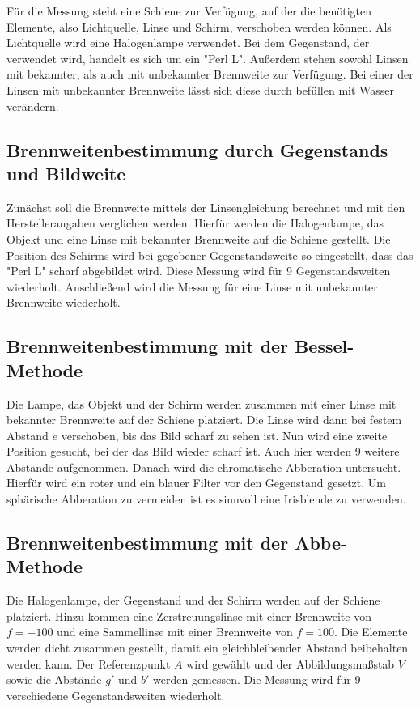 Für die Messung steht eine Schiene zur Verfügung, auf der die benötigten Elemente,
also Lichtquelle, Linse und Schirm, verschoben werden können. Als Lichtquelle
wird eine Halogenlampe verwendet. Bei dem Gegenstand, der verwendet wird, handelt
es sich um ein "Perl L". Außerdem stehen sowohl Linsen mit bekannter, als auch
mit unbekannter Brennweite zur Verfügung. Bei einer der Linsen mit unbekannter
Brennweite lässt sich diese durch befüllen mit Wasser verändern.

\subsection{Brennweitenbestimmung durch Gegenstands und Bildweite}
Zunächst soll die Brennweite mittels der Linsengleichung berechnet und mit den
Herstellerangaben verglichen werden. Hierfür werden die Halogenlampe, das Objekt
und eine Linse mit bekannter Brennweite auf die Schiene gestellt. Die Position
des Schirms wird bei gegebener Gegenstandsweite so eingestellt, dass das
"Perl L" scharf abgebildet wird. Diese Messung wird für 9 Gegenstandsweiten wiederholt.
Anschließend wird die Messung für eine Linse mit unbekannter Brennweite wiederholt.
\subsection{Brennweitenbestimmung mit der Bessel-Methode}
Die Lampe, das Objekt und der Schirm werden zusammen mit einer Linse mit
bekannter Brennweite auf der Schiene platziert. Die Linse wird dann bei festem
Abstand $e$ verschoben, bis das Bild scharf zu sehen ist. Nun wird eine zweite
Position gesucht, bei der das Bild wieder scharf ist. Auch hier werden 9 weitere
Abstände aufgenommen.
Danach wird die chromatische Abberation untersucht. Hierfür wird ein roter
und ein blauer Filter vor den Gegenstand gesetzt. Um sphärische Abberation zu
vermeiden ist es sinnvoll eine Irisblende zu verwenden.
\subsection{Brennweitenbestimmung mit der Abbe-Methode}
Die Halogenlampe, der Gegenstand und der Schirm werden auf der Schiene platziert.
Hinzu kommen eine Zerstreuungslinse mit einer Brennweite von $f = -100$ und eine
Sammellinse mit einer Brennweite von $f=100$. Die Elemente werden dicht zusammen
gestellt, damit ein gleichbleibender Abstand beibehalten werden kann. Der Referenzpunkt $A$
wird gewählt und der Abbildungsmaßstab $V$ sowie die Abstände $g'$ und $b'$
werden gemessen. Die Messung wird für 9 verschiedene Gegenstandsweiten wiederholt.
